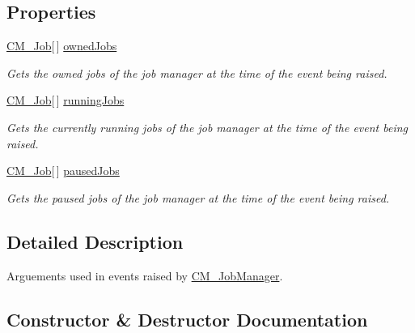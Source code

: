 \subsection*{Properties}
\begin{DoxyCompactItemize}
\item 
\hyperlink{class_c_m___job}{C\+M\+\_\+\+Job}\mbox{[}$\,$\mbox{]} \hyperlink{class_c_m___job_manager_event_args_ab3f9e101be895139ac984b0a5abe5c55}{owned\+Jobs}
\begin{DoxyCompactList}\small\item\em Gets the owned jobs of the job manager at the time of the event being raised. \end{DoxyCompactList}\item 
\hyperlink{class_c_m___job}{C\+M\+\_\+\+Job}\mbox{[}$\,$\mbox{]} \hyperlink{class_c_m___job_manager_event_args_a354cda77d3151fa14c5a862de00c6fda}{running\+Jobs}
\begin{DoxyCompactList}\small\item\em Gets the currently running jobs of the job manager at the time of the event being raised. \end{DoxyCompactList}\item 
\hyperlink{class_c_m___job}{C\+M\+\_\+\+Job}\mbox{[}$\,$\mbox{]} \hyperlink{class_c_m___job_manager_event_args_a655cd7e19559fa5cad8a10c8a4c40992}{paused\+Jobs}
\begin{DoxyCompactList}\small\item\em Gets the paused jobs of the job manager at the time of the event being raised. \end{DoxyCompactList}\end{DoxyCompactItemize}


\subsection{Detailed Description}
Arguements used in events raised by \hyperlink{class_c_m___job_manager}{C\+M\+\_\+\+Job\+Manager}. 



\subsection{Constructor \& Destructor Documentation}
\hypertarget{class_c_m___job_manager_event_args_a3bf019737d565f11c527b36e39dff77d}{}
